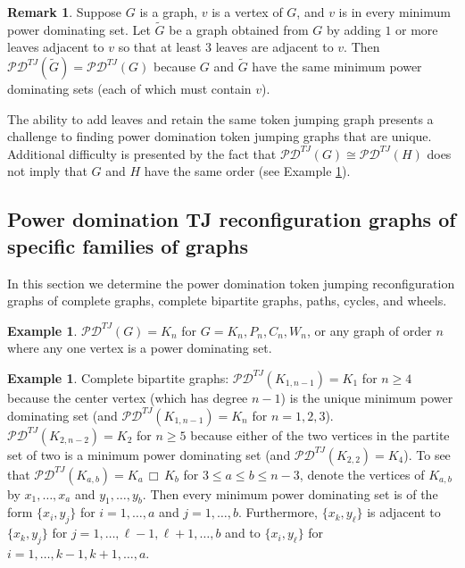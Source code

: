 \documentclass{article}
\numberwithin{figure}{section}   %
\theoremstyle{definition}
\newtheorem{rem}[thm]{Remark}
\theoremstyle{definition}
\theoremstyle{definition}
\newtheorem{ex}[thm]{Example}
\newcommand{\cp}{\, \Box\,}
\newcommand{\te}{\mathscr{PD}^{TJ}}
\begin{document}
\begin{rem}\label{p:add-leaves}
Suppose $G$ is a graph, $v$ is a vertex of $G$, and $v$ is in every minimum power dominating set.  Let $\tilde G$  be a graph obtained from $G$ by adding $1$ or more leaves adjacent to $v$ so that at least $3$ leaves are adjacent to $v$.  Then $\te(\tilde G)=\te (G)$ because $G$ and $\tilde G$ have the same minimum power dominating sets (each of which must contain $v$).
\end{rem}

 The ability to add leaves and retain the same token jumping graph presents a challenge to finding power domination token jumping graphs that are unique.  Additional difficulty is presented by the fact that $\te(G)\cong\te(H)$ does not imply that $G$ and $H$ have the same order (see Example \ref{e:Kpq}).

\subsection{Power domination TJ reconfiguration graphs of specific families of graphs}

In this section we  determine the power domination token jumping reconfiguration graphs  of complete graphs, complete bipartite graphs, paths, cycles, and wheels. 



\begin{ex}\label{e:Kn} $\te(G)=K_n$ for $G=K_n, P_n, C_n, W_n$, or any graph of order $n$ where any one vertex is a power dominating  set.
\end{ex}




\begin{ex}\label{e:Kpq} Complete bipartite graphs:  $\te(K_{1,n-1})=K_1$ for $n\ge 4$ because the center vertex (which has degree $n-1$) is the unique minimum power dominating set (and $\te(K_{1,n-1})=K_n$ for $n=1,2,3$). $\te(K_{2,n-2})=K_2$ for $n\ge 5$ because either of the two vertices in the partite set of two is a minimum power dominating set (and $\te(K_{2,2})=K_4$).  
To see that $\te(K_{a,b})=K_a\cp K_b$ for $3\le a\le b\le n-3$, denote the vertices of $K_{a,b}$ by $x_1,\dots,x_a$ and $y_1,\dots,y_b$.  Then every minimum power dominating set is of the form $\{x_i,y_j\}$ for $i=1,\dots,a$ and $ j=1,\dots,b$.  Furthermore, $\{x_k,y_\ell\}$ is adjacent to $\{x_k,y_j\}$ for  $ j=1,\dots,\ell-1,\ell+1,\dots,b$ and to $\{x_i,y_\ell\}$ for $ i=1,\dots,k-1,k+1,\dots,a$. 
\end{ex}
\end{document}
